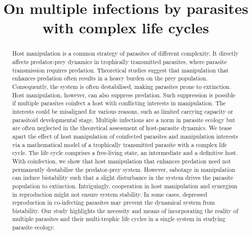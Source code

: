 \documentclass[a4paper]{scrartcl}
\begin{document}
\sffamily
\title{
On multiple infections by parasites with complex life cycles
}   

\date{}
\maketitle

\onehalfspacing

\linenumbers

\begin{abstract}
{
\sffamily
Host manipulation is a common strategy of parasites of different complexity. 
It directly affects predator-prey dynamics in trophically transmitted parasites, where parasite transmission requires predation. Theoretical studies suggest that manipulation that enhances predation often results in a heavy burden on the prey population. 
Consequently, the system is often destabilised, making parasites prone to extinction. 
Host manipulation, however, can also suppress predation.
Such suppression is possible if multiple parasites coinfect a host with conflicting interests in manipulation. 
The interests could be misaligned for various reasons, such as limited carrying capacity or parasitoid developmental stage.
Multiple infections are a norm in parasite ecology but are often neglected in the theoretical assessment of host-parasite dynamics.
We tease apart the effect of host manipulation of coinfected parasites and manipulation interests via a mathematical model of a trophically transmitted parasite with a complex life cycle.
The life cycle comprises a free-living state, an intermediate and a definitive host. 
With coinfection, we show that host manipulation that enhances predation need not permanently destabilise the predator-prey system. 
However, sabotage in manipulation can induce bistability such that a slight disturbance in the system drives the parasite population to extinction. 
Intriguingly, cooperation in host manipulation and synergism in reproduction might not ensure system stability. 
In some cases, depressed reproduction in co-infecting parasites may prevent the dynamical system from bistability.
Our study highlights the necessity and means of incorporating the reality of multiple parasites and their multi-trophic life cycles in a single system in studying parasite ecology.
}
\end{abstract}
\end{document}
